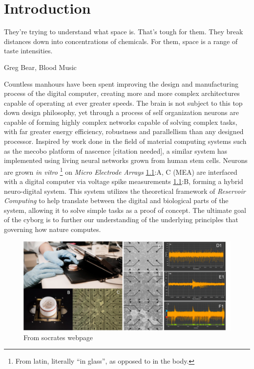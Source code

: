 \chapter{Introduction}
\epigraph{They're trying to understand what space is. That's tough for them.
They break distances down into concentrations of chemicals. For them, space is a
range of taste intensities.}{Greg Bear, Blood Music}
%
Countless manhours have been spent improving the design and manufacturing
process of the digital computer, creating more and more complex architectures
capable of operating at ever greater speeds.
%
The brain is not subject to this top down design philosophy, yet through a
process of self organization neurons are capable of forming highly complex
networks capable of solving complex tasks, with far greater energy efficiency,
robustness and parallellism than any designed processor.
%
Inspired by work done in the field of material computing systems such as the
mecobo platform of nascence [citation needed], a similar system has implemented
using living neural networks grown from human stem cells.
Neurons are grown \emph{in vitro} \footnote{From latin, literally ``in glass'',
as opposed to in the body.} on \emph{Micro Electrode Arrays} \ref{neuroIntro}:A,
C (MEA) are interfaced with a digital computer via voltage spike measurements
\ref{neuroIntro}:B, forming a hybrid neuro-digital system.
%
This system utilizes the theoretical framework of \emph{Reservoir Computing} to
help translate between the digital and biological parts of the system, allowing
it to solve simple tasks as a proof of concept.
%
The ultimate goal of the cyborg is to further our understanding of the
underlying principles that governing how nature computes.
\begin{figure}[h!]
  \centering
  \includegraphics[width=1\textwidth]{fig/MEA_overview.png}
  \caption{From socrates webpage}
  \label{neuroIntro}
\end{figure}
